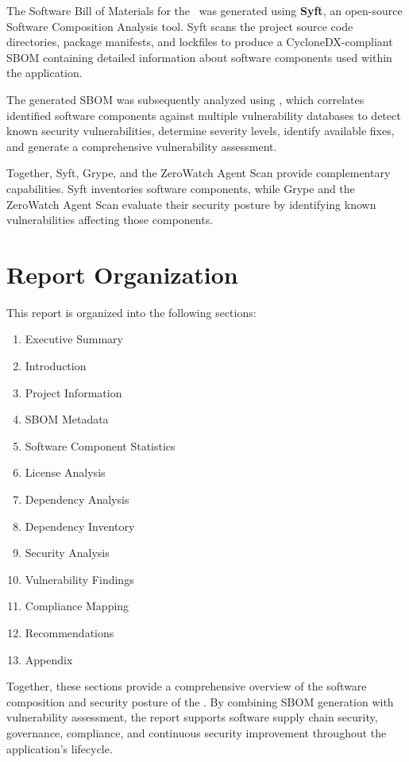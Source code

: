 The Software Bill of Materials for the \ProjectName\ was generated using \textbf{Syft}, an open-source Software Composition Analysis tool. Syft scans the project source code directories, package manifests, and lockfiles to produce a CycloneDX-compliant SBOM containing detailed information about software components used within the application.

The generated SBOM was subsequently analyzed using \textbf{\VulScanner}, which correlates identified software components against multiple vulnerability databases to detect known security vulnerabilities, determine severity levels, identify available fixes, and generate a comprehensive vulnerability assessment.

Together, Syft, Grype, and the ZeroWatch Agent Scan provide complementary capabilities. Syft inventories software components, while Grype and the ZeroWatch Agent Scan evaluate their security posture by identifying known vulnerabilities affecting those components.

\vspace{0.4cm}

\section{Report Organization}

This report is organized into the following sections:
\begin{enumerate}
\item Executive Summary
\item Introduction
\item Project Information
\item SBOM Metadata
\item Software Component Statistics
\item License Analysis
\item Dependency Analysis
\item Dependency Inventory
\item Security Analysis
\item Vulnerability Findings
\item Compliance Mapping
\item Recommendations
\item Appendix
\end{enumerate}

Together, these sections provide a comprehensive overview of the software composition and security posture of the \ProjectName. By combining SBOM generation with vulnerability assessment, the report supports software supply chain security, governance, compliance, and continuous security improvement throughout the application's lifecycle.